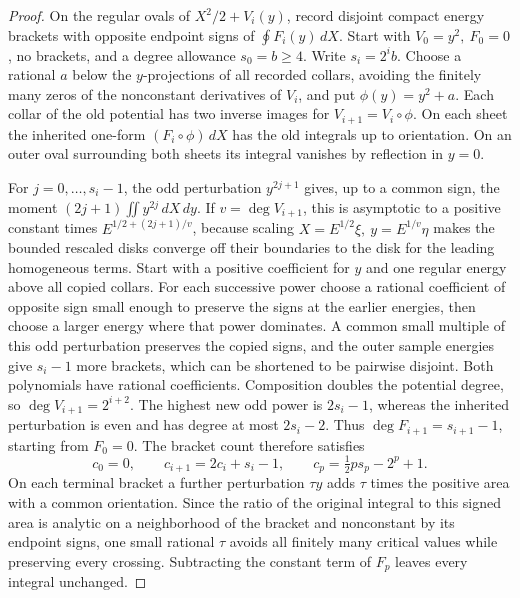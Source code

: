 \begin{proof}
On the regular ovals of \(X^2/2+V_i(y)\), record disjoint compact energy brackets with opposite endpoint signs of \(\oint F_i(y)\,dX\). Start with \(V_0=y^2,\ F_0=0\), no brackets, and a degree allowance \(s_0=b\ge4\). Write \(s_i=2^i b\). Choose a rational \(a\) below the \(y\)-projections of all recorded collars, avoiding the finitely many zeros of the nonconstant derivatives of \(V_i\), and put \(\phi(y)=y^2+a\). Each collar of the old potential has two inverse images for \(V_{i+1}=V_i\circ\phi\). On each sheet the inherited one-form \((F_i\circ\phi)\,dX\) has the old integrals up to orientation. On an outer oval surrounding both sheets its integral vanishes by reflection in \(y=0\).

For \(j=0,\ldots,s_i-1\), the odd perturbation \(y^{2j+1}\) gives, up to a common sign, the moment \((2j+1)\iint y^{2j}\,dX\,dy\). If \(v=\deg V_{i+1}\), this is asymptotic to a positive constant times \(E^{1/2+(2j+1)/v}\), because scaling \(X=E^{1/2}\xi,\ y=E^{1/v}\eta\) makes the bounded rescaled disks converge off their boundaries to the disk for the leading homogeneous terms. Start with a positive coefficient for \(y\) and one regular energy above all copied collars. For each successive power choose a rational coefficient of opposite sign small enough to preserve the signs at the earlier energies, then choose a larger energy where that power dominates. A common small multiple of this odd perturbation preserves the copied signs, and the outer sample energies give \(s_i-1\) more brackets, which can be shortened to be pairwise disjoint. Both polynomials have rational coefficients. Composition doubles the potential degree, so \(\deg V_{i+1}=2^{i+2}\). The highest new odd power is \(2s_i-1\), whereas the inherited perturbation is even and has degree at most \(2s_i-2\). Thus \(\deg F_{i+1}=s_{i+1}-1\), starting from \(F_0=0\). The bracket count therefore satisfies
\[
 c_0=0,\qquad c_{i+1}=2c_i+s_i-1,\qquad c_p=\tfrac12p s_p-2^p+1 .
\]
On each terminal bracket a further perturbation \(\tau y\) adds \(\tau\) times the positive area with a common orientation. Since the ratio of the original integral to this signed area is analytic on a neighborhood of the bracket and nonconstant by its endpoint signs, one small rational \(\tau\) avoids all finitely many critical values while preserving every crossing. Subtracting the constant term of \(F_p\) leaves every integral unchanged.


\end{proof}
